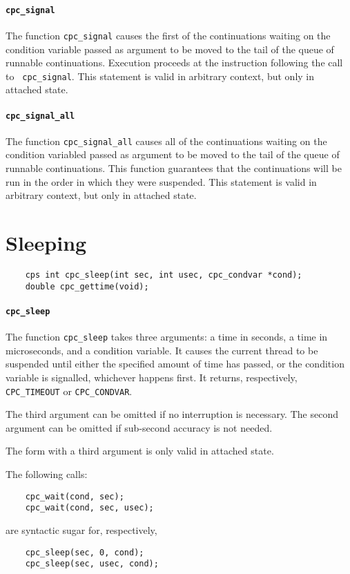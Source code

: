 \documentclass[a4paper]{report}
\begin{document}
\paragraph{\tt cpc\_signal} The function {\tt cpc\_signal} causes the
first of the continuations waiting on the condition variable passed as
argument to be moved to the tail of the queue of runnable continuations.
Execution proceeds at the instruction following the call to {\tt
  cpc\_signal}.  This statement is valid in arbitrary context, but only in
attached state.

\paragraph{\tt cpc\_signal\_all} The function {\tt cpc\_signal\_all}
causes all of the continuations waiting on the condition variabled passed
as argument to be moved to the tail of the queue of runnable continuations.
This function guarantees that the continuations will be run in the order in
which they were suspended.  This statement is valid in arbitrary context,
but only in attached state.

\section{Sleeping}

\begin{verbatim}
    cps int cpc_sleep(int sec, int usec, cpc_condvar *cond);
    double cpc_gettime(void);
\end{verbatim}

\paragraph{\tt cpc\_sleep} The function {\tt cpc\_sleep} takes three
arguments: a time in seconds, a time in microseconds, and a condition
variable.  It causes the current thread to be suspended until
either the specified amount of time has passed, or the condition
variable is signalled, whichever happens first.  It returns,
respectively, {\tt CPC\_TIMEOUT} or {\tt CPC\_CONDVAR}.

The third argument can be omitted if no interruption is necessary.
The second argument can be omitted if sub-second accuracy is not
needed.

The form with a third argument is only valid in attached state.

The following calls:
\begin{verbatim}
    cpc_wait(cond, sec);
    cpc_wait(cond, sec, usec);
\end{verbatim}
are syntactic sugar for, respectively,
\begin{verbatim}
    cpc_sleep(sec, 0, cond);
    cpc_sleep(sec, usec, cond);
\end{verbatim}
\end{document}
